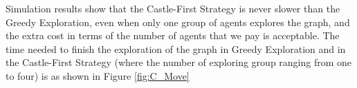 Simulation results show that the {\sc Castle-First} Strategy is never slower than the {\sc Greedy} Exploration, even when only one group of agents explores the graph,  and the extra cost in terms of the number of agents that we pay is acceptable. The time needed to finish the exploration of the graph in {\sc Greedy} Exploration and in the {\sc Castle-First} Strategy (where the number of exploring group ranging from one to four) is as shown in Figure \ref{fig:C_Move}

\begin{figure} [H] 
  \centering 
    \hspace{1in} 

\end{figure}
